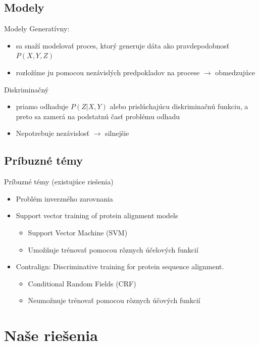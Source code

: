 \documentclass[xcolor=dvipsnames, compress, 12pt, t]{beamer}
\begin{document}
\subsection{Modely}
\begin{frame}{Modely}
Generatívny:
\begin{itemize}
\item sa snaží modelovať proces, ktorý generuje dáta ako pravdepodobnosť $P(X,Y,Z)$
\item rozložíme ju pomocou nezávislých predpokladov na procese $\longrightarrow$ obmedzujúce
\end{itemize}
\pause
Diskriminačný
\begin{itemize}
\item priamo odhaduje $P(Z|X,Y)$ alebo prislúchajúcu diskriminačnú funkciu, a preto sa zamerá na podstatnú časť problému odhadu
\item Nepotrebuje nezávislosť $\longrightarrow$ silnejšie
\end{itemize}
\end{frame}


\subsection{Príbuzné témy}
\begin{frame}{Príbuzné témy (existujúce riešenia)}
  \begin{itemize}
    \item Problém inverzného zarovnania
    \pause
    \item Support vector training of protein alignment models
    \begin{itemize}
      \item Support Vector Machine (SVM)
      \item Umožňuje trénovať pomocou rôznych účelových funkcií
    \end{itemize}
    \pause
    \item Contralign: Discriminative training for protein sequence alignment.
    \begin{itemize}
      \item Conditional Random Fields (CRF)
      \item Neumožnuje trénovať pomocou rôznych účových funkcií
    \end{itemize}
  \end{itemize}
\end{frame}


\section{Naše riešenia}
\end{document}
